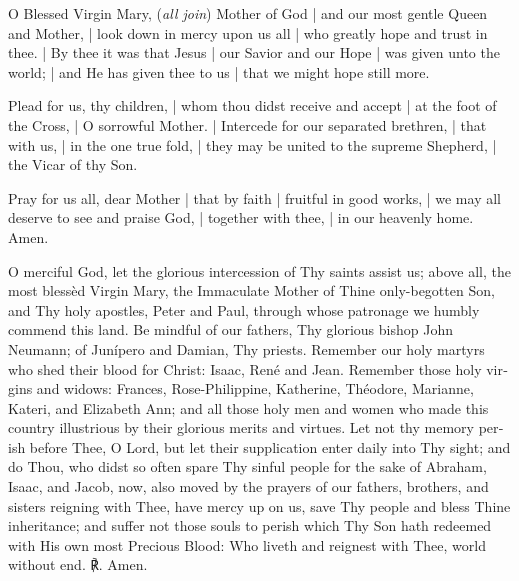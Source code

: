 \documentclass[11pt]{article}
\begin{document}
\begin{otherlanguage}{english}{\par}



\lettrine{O}{} Blessed Virgin Mary, (\textit{all join}) Mother of God | and our most gentle Queen and Mother, | look down in mercy upon us all | who greatly hope and trust in thee. | By thee it was that Jesus | our Savior and our Hope | was given unto the world; | and He has given thee to us | that we might hope still more.

Plead for us, thy children, | whom thou didst receive and accept | at the foot of the Cross, | O sorrowful Mother. | Intercede for our separated brethren, | that with us, | in the one true fold, | they may be united to the supreme Shepherd, | the Vicar of thy Son.

Pray for us all, dear Mother | that by faith | fruitful in good works, | we may all deserve to see and praise God, | together with thee, | in our heavenly home. Amen.



\lettrine{O}{} merciful God, let the glorious intercession of Thy saints assist us; above all, the most blessèd Virgin Mary, the Immaculate Mother of Thine only-begotten Son, and Thy holy apostles, Peter and Paul, through whose patronage we humbly commend this land. Be mindful of our fathers, Thy glorious bishop John Neumann; of Junípero and Damian, Thy priests. Remember our holy martyrs who shed their blood for Christ: Isaac, René and Jean. Remember those holy virgins and widows: Frances, Rose-Philippine, Katherine, Théodore, Marianne, Kateri, and Elizabeth Ann; and all those holy men and women who made this country illustrious by their glorious merits and virtues. Let not thy memory perish before Thee, O Lord, but let their supplication enter daily into Thy sight; and do Thou, who didst so often spare Thy sinful people for the sake of Abraham, Isaac, and Jacob, now, also moved by the prayers of our fathers, brothers, and sisters reigning with Thee, have mercy up on us, save Thy people and bless Thine inheritance; and suffer not those souls to perish which Thy Son hath redeemed with His own most Precious Blood: Who liveth and reignest with Thee, world without end. ℟. Amen.


\end{otherlanguage}
\end{document}
